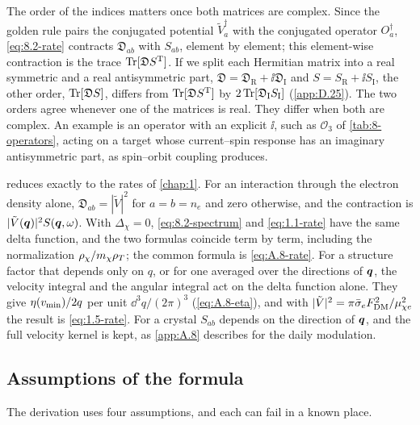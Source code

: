 The order of the indices matters once both matrices are complex. Since the golden rule pairs the conjugated potential $\tilde V_a^\dagger$ with the conjugated operator $O_a^\dagger$, \cref{eq:8.2-rate} contracts $\mathfrak{D}_{ab}$ with $S_{ab}$, element by element; this element-wise contraction is the trace $\operatorname{Tr}[\mathfrak{D}S^{\mathrm{T}}]$. If we split each Hermitian matrix into a real symmetric and a real antisymmetric part, $\mathfrak{D} = \mathfrak{D}_{\mathrm{R}} + \ii\mathfrak{D}_{\mathrm{I}}$ and $S = S_{\mathrm{R}} + \ii S_{\mathrm{I}}$, the other order, $\operatorname{Tr}[\mathfrak{D}S]$, differs from $\operatorname{Tr}[\mathfrak{D}S^{\mathrm{T}}]$ by $2\operatorname{Tr}[\mathfrak{D}_{\mathrm{I}}S_{\mathrm{I}}]$ (\cref{app:D.25}). The two orders agree whenever one of the matrices is real. They differ when both are complex. An example is an operator with an explicit $\ii$, such as $\mathcal{O}_3$ of \cref{tab:8-operators}, acting on a target whose current--spin response has an imaginary antisymmetric part, as spin--orbit coupling produces.

 reduces exactly to the rates of \cref{chap:1}. For an interaction through the electron density alone, $\mathfrak{D}_{ab} = |\tilde V|^2$ for $a = b = n_e$ and zero otherwise, and the contraction is $|\tilde V(\bm{q})|^2S(\bm{q},\omega)$. With $\Delta_\chi = 0$, \cref{eq:8.2-spectrum} and \cref{eq:1.1-rate} have the same delta function, and the two formulas coincide term by term, including the normalization $\rho_\chi/m_{\chi}\rho_T$; the common formula is \cref{eq:A.8-rate}. For a structure factor that depends only on $q$, or for one averaged over the directions of $\bm{q}$, the velocity integral and the angular integral act on the delta function alone. They give $\eta(v_{\mathrm{min}})/2q$ per unit $\dd^3q/(2\pi)^3$ (\cref{eq:A.8-eta}), and with $|\tilde V|^2 = \pi\bar{\sigma}_{e}F_{\mathrm{DM}}^2/\mu_{\chi e}^2$ the result is \cref{eq:1.5-rate}. For a crystal $S_{ab}$ depends on the direction of $\bm{q}$, and the full velocity kernel is kept, as \cref{app:A.8} describes for the daily modulation.

\subsection{Assumptions of the formula}\label{sec:8.2-conditions}

The derivation uses four assumptions, and each can fail in a known place.

